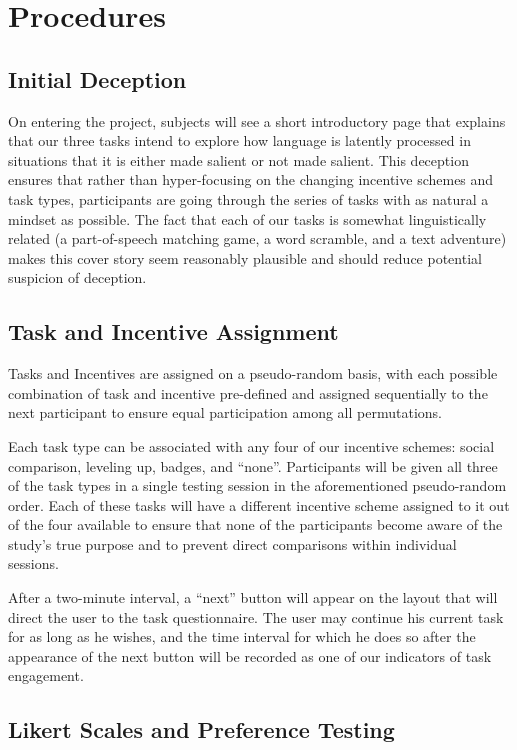 \section{Procedures}
 \subsection{Initial Deception}
On entering the project, subjects will see a short introductory page that explains that our three tasks intend to explore how language is latently processed in situations that it is either made salient or not made salient. This deception ensures that rather than hyper-focusing on the changing incentive schemes and task types, participants are going through the series of tasks with as natural a mindset as possible. The fact that each of our tasks is somewhat linguistically related (a part-of-speech matching game, a word scramble, and a text adventure) makes this cover story seem reasonably plausible and should reduce potential suspicion of deception.
 
 \subsection{Task and Incentive Assignment}
Tasks and Incentives are assigned on a pseudo-random basis, with each possible combination of task and incentive pre-defined and assigned sequentially to the next participant to ensure equal participation among all permutations.

Each task type can be associated with any four of our incentive schemes: social comparison, leveling up, badges, and “none”. Participants will be given all three of the task types in a single testing session in the aforementioned pseudo-random order. Each of these tasks will have a different incentive scheme assigned to it out of the four available to ensure that none of the participants become aware of the study’s true purpose and to prevent direct comparisons within individual sessions.

After a two-minute interval, a “next” button will appear on the layout that will direct the user to the task questionnaire. The user may continue his current task for as long as he wishes, and the time interval for which he does so after the appearance of the next button will be recorded as one of our indicators of task engagement.  
 \subsection{Likert Scales and Preference Testing}

